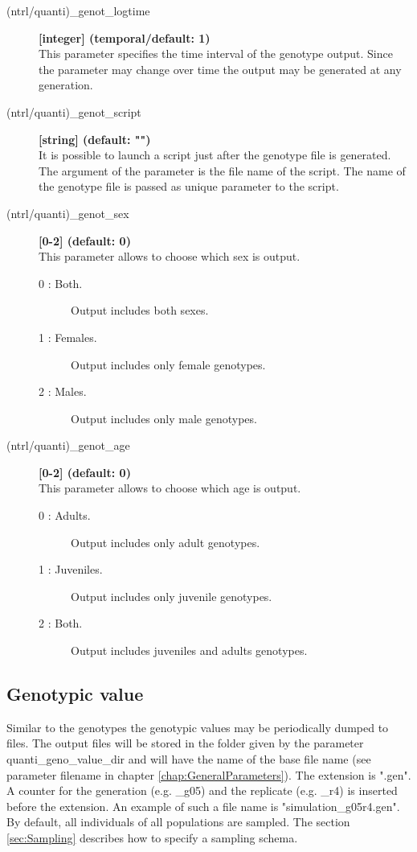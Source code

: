 \documentclass[letterpaper,12pt,oneside]{book}
\begin{document}
\begin{description}
\item[(ntrl/quanti)\_genot\_logtime] \textbf{[integer] (temporal/default: 1)}\\
This parameter specifies the time interval of the genotype output. Since the parameter may change over time the output may be generated at any generation.

\item[(ntrl/quanti)\_genot\_script] \textbf{[string] (default: "")}\\
It is possible to launch a script just after the genotype file is generated. The argument of the parameter is the file name of the script. The name of the genotype file is passed as unique parameter to the script. 

\item[(ntrl/quanti)\_genot\_sex] \textbf{[0-2] (default: 0)}\\
This parameter allows to choose which sex is output. 
\begin{description}
\item [0 : Both.] Output includes both sexes.
\item [1 : Females.] Output includes only female genotypes.
\item [2 : Males.] Output includes only male genotypes.
\end{description}

\item[(ntrl/quanti)\_genot\_age] \textbf{[0-2] (default: 0)}\\
This parameter allows to choose which age is output.  
\begin{description}
\item [0 : Adults.] Output includes only adult genotypes.
\item [1 : Juveniles.] Output includes only juvenile genotypes.
\item [2 : Both.] Output includes juveniles and adults genotypes.
\end{description}
\end{description}



\subsection{Genotypic value}\label{genoValQuanti}
Similar to the genotypes the genotypic values may be periodically dumped to files. The output files will be stored in the folder given by the parameter \textsf{quanti\_geno\_value\_dir} and will have the name of the base file name (see parameter \textsf{filename} in chapter \ref{chap:GeneralParameters}). The extension is ".gen". A counter for the generation (e.g. \_g05) and the replicate (e.g. \_r4) is inserted before the extension. An example of such a file name is \textsf{"simulation\_g05r4.gen"}. By default, all individuals of all populations are sampled. The section \ref{sec:Sampling} describes how to specify a sampling schema.
\end{document}
